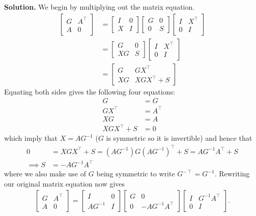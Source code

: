 \documentclass{letter}
\newcommand{\Solution}[1]{%
	\textbf{Solution.} #1 \par%
}
\newcommand{\T}{\intercal}
\begin{document}
    \Solution{We begin by multiplying out the matrix equation. \begin{align*}
        \begin{bmatrix} G & A^\T \\ A & 0 \end{bmatrix} &= \begin{bmatrix} I & 0 \\ X & I \end{bmatrix} \begin{bmatrix} G & 0 \\ 0 & S \end{bmatrix} \begin{bmatrix} I & X^\T \\ 0 & I \end{bmatrix} \\
        &= \begin{bmatrix} G & 0 \\ XG & S \end{bmatrix} \begin{bmatrix} I & X^\T \\ 0 & I \end{bmatrix} \\
        &= \begin{bmatrix} G & GX^\T \\ XG & XGX^\T + S \end{bmatrix}
    \end{align*} Equating both sides gives the following four equations: \begin{align*}
        G &= G \\ 
        GX^\T &= A^\T \\ 
        XG &= A \\
        XGX^\T + S &= 0
    \end{align*} which imply that $X = AG^{-1}$ ($G$ is symmetric so it is invertible) and hence that \begin{align*}
        0 &= XGX^\T + S = (AG^{-1})G(AG^{-1})^\T + S = AG^{-1}A^\T + S \\
        \implies S &= -AG^{-1}A^\T
    \end{align*} where we also make use of $G$ being symmetric to write $G^{-\T} = G^{-1}$. Rewriting our original matrix equation now gives \begin{align*}
        \begin{bmatrix} G & A^\T \\ A & 0 \end{bmatrix} = \begin{bmatrix} I & 0 \\ AG^{-1} & I \end{bmatrix} \begin{bmatrix} G & 0 \\ 0 & -AG^{-1}A^\T \end{bmatrix} \begin{bmatrix} I & G^{-1}A^\T \\ 0 & I \end{bmatrix}.

\end{align*}}
\end{document}
